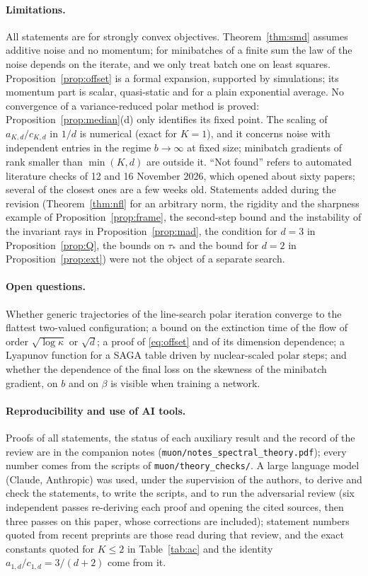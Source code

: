 \documentclass[11pt]{article}
\theoremstyle{remark}
\begin{document}
\paragraph{Limitations.} All statements are for strongly convex objectives. Theorem~\ref{thm:smd} assumes additive
noise and no momentum; for minibatches of a finite sum the law of the noise depends on the iterate, and we only treat
batch one on least squares. Proposition~\ref{prop:offset} is a formal expansion, supported by simulations; its momentum
part is scalar, quasi-static and for a plain exponential average. No convergence of a variance-reduced polar method is
proved: Proposition~\ref{prop:median}(d) only identifies its fixed point. The scaling of $a_{K,d}/c_{K,d}$ in $1/d$ is
numerical (exact for $K=1$), and it concerns noise with independent entries in the regime $b\to\infty$ at fixed size;
minibatch gradients of rank smaller than $\min(K,d)$ are outside it. ``Not found'' refers to automated literature
checks of 12 and 16 November 2026, which opened about sixty papers; several of the closest ones are a few weeks old.
Statements added during the revision (Theorem~\ref{thm:nfl} for an arbitrary norm, the rigidity and the sharpness
example of Proposition~\ref{prop:frame}, the second-step bound and the instability of the invariant rays in
Proposition~\ref{prop:mad}, the condition for $d=3$ in Proposition~\ref{prop:Q}, the bounds on $\tau_\ast$ and the bound
for $d=2$ in Proposition~\ref{prop:ext}) were not the object of a separate search.

\paragraph{Open questions.} Whether generic trajectories of the line-search polar iteration converge to the flattest
two-valued configuration; a bound on the extinction time of the flow of order $\sqrt{\log\kappa}$ or $\sqrt d$; a proof
of \eqref{eq:offset} and of its dimension dependence; a Lyapunov function for a SAGA table driven by nuclear-scaled
polar steps; and whether the dependence of the final loss on the skewness of the minibatch gradient, on $b$ and on
$\beta$ is visible when training a network.

\paragraph{Reproducibility and use of AI tools.} Proofs of all statements, the status of each auxiliary result and the
record of the review are in the companion notes (\texttt{muon/notes\_spectral\_theory.pdf}); every number comes from the
scripts of \texttt{muon/theory\_checks/}. A large language model (Claude, Anthropic) was used, under the supervision of
the authors, to derive and check the statements, to write the scripts, and to run the adversarial review (six
independent passes re-deriving each proof and opening the cited sources, then three passes on this paper, whose
corrections are included); statement numbers quoted from recent preprints are those read during that review, and the
exact constants quoted for $K\le2$ in Table~\ref{tab:ac} and the identity $a_{1,d}/c_{1,d}=3/(d+2)$ come from it.



\end{document}
